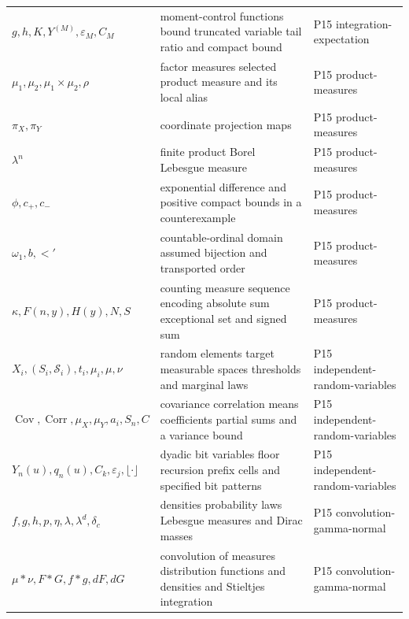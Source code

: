 \begin{longtable}{@{}p{}p{}p{}@{}}
\(g,\allowbreak h,\allowbreak K,\allowbreak Y^{(M)},\allowbreak \varepsilon_M,\allowbreak C_M\) & moment-control functions bound truncated variable tail ratio and compact bound & P15 integration-\allowbreak{}expectation \\
\(\mu_1,\allowbreak \mu_2,\allowbreak \mu_1\times\mu_2,\allowbreak \rho\) & factor measures selected product measure and its local alias & P15 product-\allowbreak{}measures \\
\(\pi_X,\allowbreak \pi_Y\) & coordinate projection maps & P15 product-\allowbreak{}measures \\
\(\lambda^n\) & finite product Borel Lebesgue measure & P15 product-\allowbreak{}measures \\
\(\phi,\allowbreak c_+,\allowbreak c_-\) & exponential difference and positive compact bounds in a counterexample & P15 product-\allowbreak{}measures \\
\(\omega_1,\allowbreak b,\allowbreak <'\) & countable-ordinal domain assumed bijection and transported order & P15 product-\allowbreak{}measures \\
\(\kappa,\allowbreak F(n,\allowbreak y),\allowbreak H(y),\allowbreak N,\allowbreak S\) & counting measure sequence encoding absolute sum exceptional set and signed sum & P15 product-\allowbreak{}measures \\
\(X_i,\allowbreak (S_i,\allowbreak \mathcal S_i),\allowbreak t_i,\allowbreak \mu_i,\allowbreak \mu,\allowbreak \nu\) & random elements target measurable spaces thresholds and marginal laws & P15 independent-\allowbreak{}random-\allowbreak{}variables \\
\(\operatorname{Cov},\allowbreak \operatorname{Corr},\allowbreak \mu_X,\allowbreak \mu_Y,\allowbreak a_i,\allowbreak S_n,\allowbreak C\) & covariance correlation means coefficients partial sums and a variance bound & P15 independent-\allowbreak{}random-\allowbreak{}variables \\
\(Y_n(u),\allowbreak q_n(u),\allowbreak C_k,\allowbreak \varepsilon_j,\allowbreak \lfloor\cdot\rfloor\) & dyadic bit variables floor recursion prefix cells and specified bit patterns & P15 independent-\allowbreak{}random-\allowbreak{}variables \\
\(f,\allowbreak g,\allowbreak h,\allowbreak p,\allowbreak \eta,\allowbreak \lambda,\allowbreak \lambda^d,\allowbreak \delta_c\) & densities probability laws Lebesgue measures and Dirac masses & P15 convolution-\allowbreak{}gamma-\allowbreak{}normal \\
\(\mu*\nu,\allowbreak F*G,\allowbreak f*g,\allowbreak dF,\allowbreak dG\) & convolution of measures distribution functions and densities and Stieltjes integration & P15 convolution-\allowbreak{}gamma-\allowbreak{}normal \\

\end{longtable}
